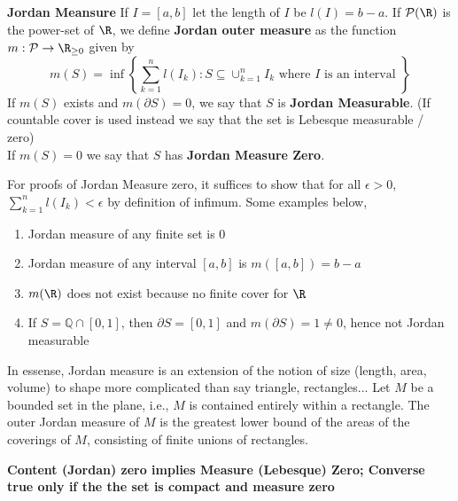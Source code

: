 \documentclass[11pt]{article}
\begin{document}
\begin{defn*}
    \textbf{Jordan Meansure} If $I = [a,b]$ let the length of $I$ be $l(I) = b-a$. If $\mathcal{P}(\R)$ is the power-set of $\R$, we define \textbf{Jordan outer measure} as the function $m: \mathcal{P} \to \R_{\geq 0}$ given by
    \[
      m(S) = \inf \left\{ \sum_{k=1}^n l(I_k) : S \subseteq \cup_{k=1}^n I_k \text{ where $I$ is an interval }\right\}
    \]
    If $m(S)$ exists and $m(\partial S) = 0$, we say that $S$ is \textbf{Jordan Measurable}. (If countable cover is used instead we say that the set is Lebesque measurable / zero)\\
    If $m(S)=0$ we say that $S$ has \textbf{Jordan Measure Zero}.
    \begin{rem}
      For proofs of Jordan Measure zero, it suffices to show that for all $\epsilon >0$, $\sum_{k=1}^n l(I_k) < \epsilon$ by definition of infimum. Some examples below,
        \begin{enumerate}
          \item Jordan measure of any finite set is 0
          \item Jordan measure of any interval $[a,b]$ is $m([a,b]) = b-a$
          \item $m(\R)$ does not exist because no finite cover for $\R$
          \item If $S = \mathbb{Q}\cap [0,1]$, then $\partial S = [0,1]$ and $m(\partial S) = 1\neq 0$, hence not Jordan measurable
        \end{enumerate}
      In essense, Jordan measure is an extension of the notion of size (length, area, volume) to shape more complicated than say triangle, rectangles... Let $M$ be a bounded set in the plane, i.e.,  $M$ is contained entirely within a rectangle. The outer Jordan measure of $M$ is the greatest lower bound of the areas of the coverings of $M$, consisting of finite unions of rectangles.
    \end{rem}
\end{defn*}

\begin{proposition*}
  \textbf{Content (Jordan) zero implies Measure (Lebesque) Zero; Converse true only if the the set is compact and measure zero}
\end{proposition*}
\end{document}
